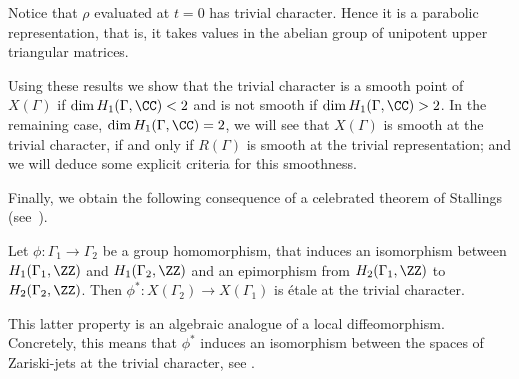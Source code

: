 Notice that $\rho$ evaluated at $t=0$ has trivial character. Hence it is a parabolic representation, that is, it takes values in the abelian group of unipotent upper triangular matrices.

Using these results we show that the trivial character is a smooth
point of $X(\Gamma)$ if $\dim H_1(\Gamma,\CC)<2$ and is not smooth
if $\dim H_1(\Gamma,\CC)>2$. In the remaining case, $\dim H_1(\Gamma,\CC)=2$,
we will see that $X(\Gamma)$ is smooth at the trivial character, if and only
if $R(\Gamma)$ is smooth at the trivial representation; and we will deduce
some explicit criteria for this smoothness.

Finally, we obtain the following consequence of a
celebrated theorem of Stallings (see~\cite{Stallings}).
\begin{theorem}\label{theo:etale}
Let $\phi\colon \Gamma_1\to \Gamma_2$ be a group homomorphism, that
induces an isomorphism between $H_1(\Gamma_1,\ZZ)$ and $H_1(\Gamma_2,\ZZ)$
and an epimorphism from $H_2(\Gamma_1,\ZZ)$ to $H_2(\Gamma_2,\ZZ)$. Then
$\phi^*\colon X(\Gamma_2)\to X(\Gamma_1)$ is étale at the trivial
character.
\end{theorem}
This latter property is an algebraic analogue of a local diffeomorphism.
Concretely, this means that $\phi^*$ induces an isomorphism between the
spaces of Zariski-jets at the trivial character,
see \eg \cite[Chap.\,4, Prop.\,3.26]{Liu}.

